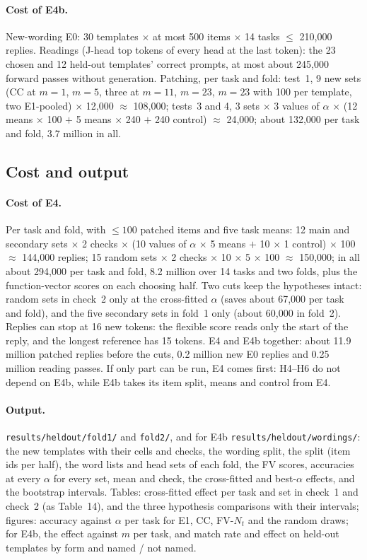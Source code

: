 \paragraph{Cost of E4b.} New-wording E0: 30 templates $\times$ at most 500 items $\times$ 14
tasks $\le$ 210{,}000 replies. Readings (J-head top tokens of every head at the last token): the
23 chosen and 12 held-out templates' correct prompts, at most about 245{,}000 forward passes
without generation. Patching, per task and fold: test~1, 9 new sets (CC at $m = 1$, $m = 5$,
three at $m = 11$, $m = 23$, $m = 23$ with 100 per template, two E1-pooled) $\times$ 12{,}000
$\approx$ 108{,}000; tests~3 and 4, 3 sets $\times$ 3 values of $\alpha$ $\times$ (12 means
$\times$ 100 $+$ 5 means $\times$ 240 $+$ 240 control) $\approx$ 24{,}000; about 132{,}000 per
task and fold, 3.7 million in all.

\subsection{Cost and output}

\paragraph{Cost of E4.} Per task and fold, with $\le 100$ patched items and five task means:
12 main and secondary sets $\times$ 2 checks $\times$ (10 values of $\alpha$ $\times$ 5 means
$+$ 10 $\times$ 1 control) $\times$ 100 $\approx$ 144{,}000 replies; 15 random sets $\times$ 2
checks $\times$ 10 $\times$ 5 $\times$ 100 $\approx$ 150{,}000; in all about 294{,}000 per task
and fold, 8.2 million over 14 tasks and two folds, plus the function-vector scores on each
choosing half. Two cuts keep the hypotheses intact: random sets in check~2 only at the
cross-fitted $\alpha$ (saves about 67{,}000 per task and fold), and the five secondary sets in
fold~1 only (about 60{,}000 in fold~2). Replies can stop at 16 new tokens: the flexible score
reads only the start of the reply, and the longest reference has 15 tokens. E4 and E4b
together: about 11.9 million patched replies before the cuts, 0.2 million new E0 replies and
0.25 million reading passes. If only part can be run, E4 comes first: H4--H6 do not depend on
E4b, while E4b takes its item split, means and control from E4.

\paragraph{Output.} \texttt{results/heldout/fold1/} and \texttt{fold2/}, and for E4b
\texttt{results/heldout/wordings/}: the new templates with their cells and checks, the
wording split, the split (item ids per half), the
word lists and head sets of each fold, the FV scores, accuracies at every $\alpha$ for every set,
mean and check, the cross-fitted and best-$\alpha$ effects, and the bootstrap intervals. Tables:
cross-fitted effect per task and set in check~1 and check~2 (as Table~14), and the three
hypothesis comparisons with their intervals; figures: accuracy against $\alpha$ per task for
E1, CC, FV-$N_t$ and the random draws; for E4b, the effect against $m$ per task, and
match rate and effect on held-out templates by form and named / not named.
